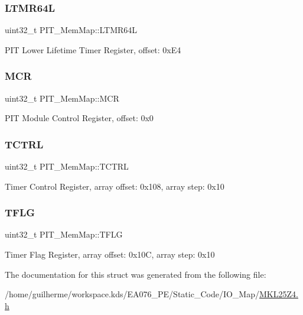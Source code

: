\subsubsection{\texorpdfstring{L\+T\+M\+R64L}{LTMR64L}}
{\footnotesize\ttfamily uint32\+\_\+t P\+I\+T\+\_\+\+Mem\+Map\+::\+L\+T\+M\+R64L}

P\+IT Lower Lifetime Timer Register, offset\+: 0x\+E4 \mbox{\label{struct_p_i_t___mem_map_a99390c5764693e07c37d40ead441a7a4}} 
\subsubsection{\texorpdfstring{M\+CR}{MCR}}
{\footnotesize\ttfamily uint32\+\_\+t P\+I\+T\+\_\+\+Mem\+Map\+::\+M\+CR}

P\+IT Module Control Register, offset\+: 0x0 \mbox{\label{struct_p_i_t___mem_map_a567cdea5c7d615341f95f1438020a7e1}} 
\subsubsection{\texorpdfstring{T\+C\+T\+RL}{TCTRL}}
{\footnotesize\ttfamily uint32\+\_\+t P\+I\+T\+\_\+\+Mem\+Map\+::\+T\+C\+T\+RL}

Timer Control Register, array offset\+: 0x108, array step\+: 0x10 \mbox{\label{struct_p_i_t___mem_map_add88e740d4ec7a83e66cf9ad79cd027a}} 
\subsubsection{\texorpdfstring{T\+F\+LG}{TFLG}}
{\footnotesize\ttfamily uint32\+\_\+t P\+I\+T\+\_\+\+Mem\+Map\+::\+T\+F\+LG}

Timer Flag Register, array offset\+: 0x10C, array step\+: 0x10 

The documentation for this struct was generated from the following file\+:\begin{DoxyCompactItemize}
\item 
/home/guilherme/workspace.\+kds/\+E\+A076\+\_\+\+P\+E/\+Static\+\_\+\+Code/\+I\+O\+\_\+\+Map/\hyperlink{_m_k_l25_z4_8h}{M\+K\+L25\+Z4.\+h}\end{DoxyCompactItemize}
